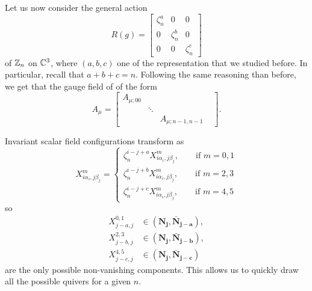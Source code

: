            Let us now consider the general action
           \begin{equation}
                R(g)=
                \begin{bmatrix}
                    \zeta^a_n & 0 & 0\\
                    0 & \zeta^b_n & 0\\
                    0 & 0 & \zeta^c_n
                \end{bmatrix}
           \end{equation}
           of $\mathbb{Z}_n$ on $\mathbb{C}^3$, where $(a,b,c)$ one of the representation that we studied before. In particular, recall that $a+b+c=n$. Following the same reasoning than before, we get that the gauge field of of the form
           \begin{equation}
               A_\mu=
               \begin{bmatrix}
                   A_{\mu;00} & & \\
                   & \ddots & & \\
                   & & A_{\mu;n-1,n-1}
               \end{bmatrix}.
           \end{equation}

           Invariant scalar field configurations transform as
           \begin{equation}
               X^m_{i\alpha_i,j\beta_j}=
               \begin{cases}
                   \zeta^{i-j+a}_nX^m_{i\alpha_i,j\beta_j},\qquad \text{if }m=0,1\\
                   \zeta^{i-j+b}_nX^m_{i\alpha_i,j\beta_j},\qquad \text{if }m=2,3\\
                   \zeta^{i-j+c}_nX^m_{i\alpha_i,j\beta_j},\qquad \text{if }m=4,5
               \end{cases}
           \end{equation}
           so
           \begin{align}
               X^{0,1}_{j-a,j} &\in (\boldsymbol{\textbf{N}_j},\boldsymbol{\bar{\textbf{N}}_{j-a}}),\\
               X^{2,3}_{j-b,j} &\in (\boldsymbol{\textbf{N}_j},\boldsymbol{\bar{\textbf{N}}_{j-b}}),\\
               X^{4,5}_{j-c,j} &\in (\boldsymbol{\textbf{N}_j},\boldsymbol{\bar{\textbf{N}}_{j-c}})
           \end{align}
           are the only possible non-vanishing components. This allows us to quickly draw all the possible quivers for a given $n$.
        
